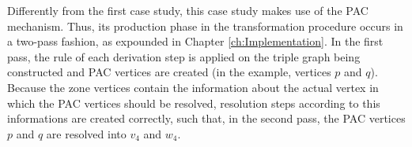 Differently from the first case study, this case study makes use of the PAC mechanism. Thus, its production phase in the transformation procedure occurs in a two-pass fashion, as expounded in Chapter \ref{ch:Implementation}. In the first pass, the rule of each derivation step is applied on the triple graph being constructed and PAC vertices are created (in the example, vertices $p$ and $q$). Because the zone vertices contain the information about the actual vertex in which the PAC vertices should be resolved, resolution steps according to this informations are created correctly, such that, in the second pass, the PAC vertices $p$ and $q$ are resolved into $v_4$ and $w_4$.

